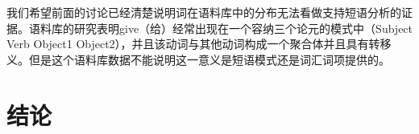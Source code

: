 \begin{exe}
\begin{xlist}[iv.]
\begin{exe}
\begin{xlist}[iv.]

\noindent
我们希望前面的讨论已经清楚说明词在语料库中的分布无法看做支持短语分析的证据。语料库的研究表明give（给）经常出现在一个容纳三个论元的模式中（Subject Verb Object1 Object2），并且该动词与其他动词构成一个聚合体并且具有转移义。但是这个语料库数据不能说明这一意义是短语模式还是词汇词项提供的。

\section{结论}

%


\end{xlist}
\end{exe}
\end{xlist}
\end{exe}
